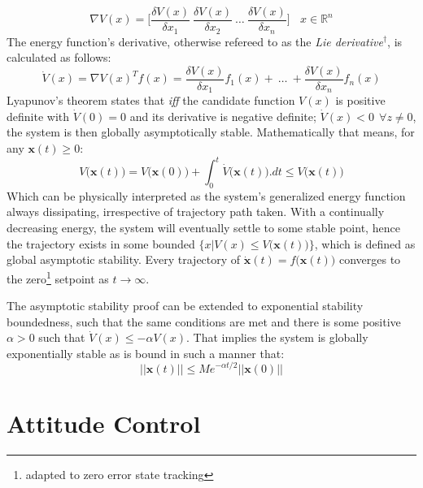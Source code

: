 \begin{equation}
\nabla V(x)=\bigg[\frac{\delta V(x)}{\delta x_1}~\frac{\delta V(x)}{\delta x_2}~\ldots~\frac{\delta V(x)}{\delta x_n}\bigg]~~~~x\in\mathbb{R}^n
\end{equation}
The energy function's derivative, otherwise refereed to as the \emph{Lie derivative}$^\dagger$, is calculated as follows:
\begin{equation}
\dot{V}(x)=\nabla V(x)^Tf(x)=\frac{\delta V(x)}{\delta x_1}f_1(x)+~\ldots~+\frac{\delta V(x)}{\delta x_n}f_n(x)
\end{equation}
Lyapunov's theorem states that \emph{iff} the candidate function $V(x)$ is positive definite with $\dot{V}(0)=0$ and its derivative is negative definite; $\dot{V}(x)< 0~~\forall z \not= 0$, the system is then globally asymptotically stable. Mathematically that means, for any $\mathbf{x}(t)\geq 0$:
\begin{equation}
V\big(\mathbf{x}(t)\big)=V\big(\mathbf{x}(0)\big)+\int_0^t \dot{V}\big(\mathbf{x}(t)\big).dt \leq V\big(\mathbf{x}(t)\big)
\end{equation}
Which can be physically interpreted as the system's generalized energy function always dissipating, irrespective of trajectory path taken. With a continually decreasing energy, the system will eventually settle to some stable point, hence the trajectory exists in some bounded $\big\{x|V(x)\leq V\big(\mathbf{x}(t)\big)\big\}$, which is defined as global asymptotic stability. Every trajectory of $\dot{\mathbf{x}}(t)=f\big(\mathbf{x}(t)\big)$ converges to the zero\footnote{adapted to zero error state tracking} setpoint as $t\rightarrow\infty$.
\par
The asymptotic stability proof can be extended to exponential stability boundedness, such that the same conditions are met and there is some positive $\alpha>0$ such that $\dot{V}(x)\leq-\alpha V(x)$. That implies the system is globally exponentially stable as is bound in such a manner that:
\begin{equation}
||\mathbf{x}(t)||\leq Me^{-\alpha t/2}||\mathbf{x}(0)||
\end{equation}
\section{Attitude Control}
\label{sec:control.attitude}
